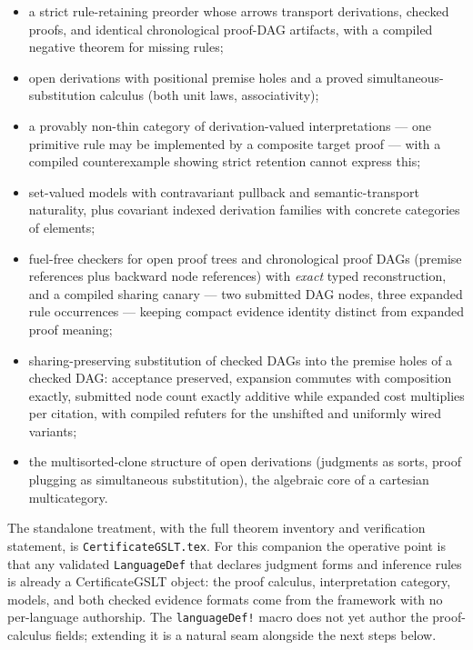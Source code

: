 \documentclass[11pt]{article}
\newcommand{\code}[1]{\texttt{#1}}
\begin{document}
\begin{itemize}
\item a strict rule-retaining preorder whose arrows transport derivations,
  checked proofs, and identical chronological proof-DAG artifacts, with a
  compiled negative theorem for missing rules;
\item open derivations with positional premise holes and a proved
  simultaneous-substitution calculus (both unit laws, associativity);
\item a provably non-thin category of derivation-valued interpretations ---
  one primitive rule may be implemented by a composite target proof --- with
  a compiled counterexample showing strict retention cannot express this;
\item set-valued models with contravariant pullback and semantic-transport
  naturality, plus covariant indexed derivation families with concrete
  categories of elements;
\item fuel-free checkers for open proof trees and chronological proof DAGs
  (premise references plus backward node references) with \emph{exact} typed
  reconstruction, and a compiled sharing canary --- two submitted DAG nodes,
  three expanded rule occurrences --- keeping compact evidence identity
  distinct from expanded proof meaning;
\item sharing-preserving substitution of checked DAGs into the premise
  holes of a checked DAG: acceptance preserved, expansion commutes with
  composition exactly, submitted node count exactly additive while
  expanded cost multiplies per citation, with compiled refuters for the
  unshifted and uniformly wired variants;
\item the multisorted-clone structure of open derivations (judgments as
  sorts, proof plugging as simultaneous substitution), the algebraic core of
  a cartesian multicategory.
\end{itemize}

The standalone treatment, with the full theorem inventory and verification
statement, is \code{CertificateGSLT.tex}.  For this companion the operative point
is that any validated \code{LanguageDef} that declares
judgment forms and inference rules is already a CertificateGSLT object: the proof
calculus, interpretation category, models, and both checked evidence formats
come from the framework with no per-language authorship.  The
\code{languageDef!} macro does not yet author the proof-calculus fields;
extending it is a natural seam alongside the next steps below.
\end{document}
